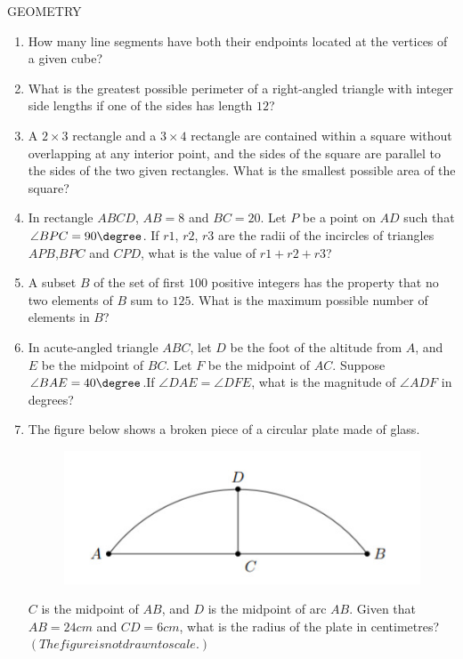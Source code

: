 \documentclass{article}
\begin{document}
\begin{center}
GEOMETRY
\end{center}
\begin{enumerate}
\item How many line segments have both their endpoints located at the vertices of a given cube?
\item What is the greatest possible perimeter of a right-angled triangle with integer side lengths if one of the sides has length $12$?
\item A $2 \times 3$ rectangle and a $3 \times 4$ rectangle are contained within a square without overlapping at any interior point, and the sides of the square are parallel to the sides of the two given rectangles. What is the smallest possible area of the square?
\item In rectangle $ABCD$, $AB = 8$ and $BC = 20$. Let $P$ be a point on $AD$ such that $\angle BPC=90\degree$. If $r1$, $r2$, $r3$ are the radii of the incircles of triangles $APB$,$BPC$ and $CPD$, what is the value of $r1 + r2 + r3$?
\item A subset $B$ of the set of first $100$ positive integers has the property that no two elements of $B$ sum to $125$. What is the maximum possible number of elements in $B$?
\item In acute-angled triangle $ABC$, let $D$ be the foot of the altitude from $A$, and $E$ be the midpoint of $BC$. Let $F$ be the midpoint of $AC$. Suppose $\angle BAE = 40\degree$.If $\angle DAE = \angle DFE$, what is the magnitude of $\angle ADF$ in degrees?
\item The figure below shows a broken piece of a circular plate made of glass.
	\begin{figure}[h]
		\centering
		\includegraphics[width=\columnwidth]{finallatex.jpg}
	\end{figure}
$C$ is the midpoint of $AB$, and $D$ is the midpoint of arc $AB$. Given that $AB = 24 cm$ and $CD = 6 cm$, what is the radius of the plate in centimetres? $\left(The figure is not drawn to scale.\right)$
\end{enumerate}
\end{document}
